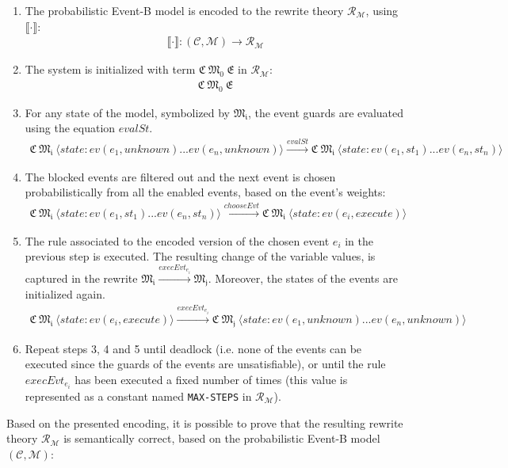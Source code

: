 \begin{enumerate}
    \item The probabilistic Event-B model is encoded to the rewrite theory $\mathscr{R}_\mathscr{M}$, using $\llbracket \cdot \rrbracket$:
    \begin{align*}
        \llbracket \cdot \rrbracket: (\mathscr{C}, \mathscr{M}) \rightarrow \mathscr{R}_\mathscr{M}
    \end{align*}
    \item The system is initialized with term $\mathfrak{C \ M_0 \ E}$ in $\mathscr{R}_\mathscr{M}$:
    \begin{align*}
        \mathfrak{C \ M_0 \ E}
    \end{align*}
    \item For any state of the model, symbolized by $\mathfrak{M_i}$, the event guards are evaluated using the equation $evalSt$.
    \begin{align*}
        \mathfrak{C \ M_i} \ \langle state: ev(e_1,unknown) ... ev(e_n, unknown) \rangle \xrightarrow{evalSt} \mathfrak{C \ M_i} \ \langle state: ev(e_1,st_1) ... ev(e_n, st_n) \rangle
    \end{align*}
    \item The blocked events are filtered out and the next event is chosen probabilistically from all the enabled events, based on the event's weights:
    \begin{align*}
        \mathfrak{C \ M_i} \ \langle state: ev(e_1,st_1) ... ev(e_n, st_n) \rangle \xrightarrow{chooseEvt} \mathfrak{C \ M_i} \ \langle state: ev(e_i,execute) \rangle
    \end{align*}
    \item The rule associated to the encoded version of the chosen event $e_i$ in the previous step is executed. The resulting change of the variable values, is captured in the rewrite $\mathfrak{M_i} \xrightarrow{execEvt_{e_i}} \mathfrak{M_j}$. Moreover, the states of the events are initialized again. 
    \begin{align*}
        \mathfrak{C \ M_i} \ \langle state: ev(e_i,execute) \rangle \xrightarrow{execEvt_{e_i}} \mathfrak{C \ M_j} \ \langle state: ev(e_1,unknown) ... ev(e_n, unknown) \rangle
    \end{align*}
    \item Repeat steps 3, 4 and 5 until deadlock (i.e. none of the events can be executed since the guards of the events are unsatisfiable), or until the rule $execEvt_{e_i}$ has been executed a fixed number of times (this value is represented as a constant named \texttt{MAX-STEPS} in $\mathscr{R}_\mathscr{M}$).
\end{enumerate}
Based on the presented encoding, it is possible to prove that the resulting rewrite theory $\mathscr{R}_\mathscr{M}$ is semantically correct, based on the probabilistic Event-B model $(\mathscr{C}, \mathscr{M})$:

